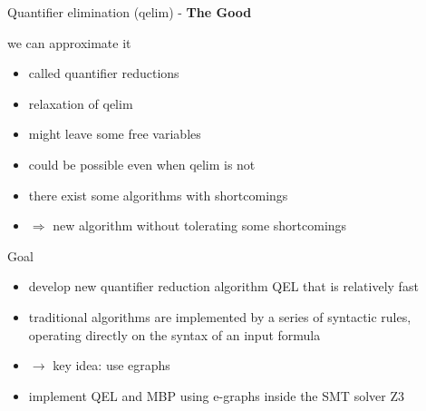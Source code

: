 \documentclass{beamer}
\begin{document}
\begin{frame}{Quantifier elimination (qelim) - \textbf{The Good}}

\begin{block}{we can approximate it}
\begin{itemize}
  \item called quantifier reductions
  \item relaxation of qelim
  \item might leave some free variables
  \pause
  \item could be possible even when qelim is not
  \item there exist some algorithms with shortcomings
  \pause
  \item $\Longrightarrow$ new algorithm without tolerating some shortcomings
\end{itemize}
\end{block}
\end{frame}


\begin{frame}{Goal}
\begin{itemize}
  \item develop new quantifier reduction algorithm QEL that is relatively fast
  \pause
    \item traditional algorithms are implemented by a series of syntactic rules, operating directly on the syntax of an input formula
    \pause
  \item $\longrightarrow$ key idea: use egraphs
    \pause
  \item implement QEL and MBP using e-graphs inside the SMT solver Z3
\end{itemize}
\end{frame}
\end{document}
